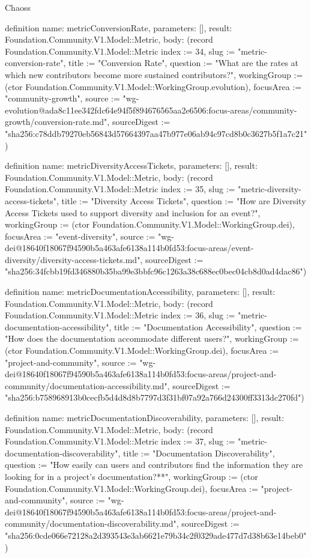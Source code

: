 \begin{lexlean}{Chaoss}
\begin{semanticmodule}
definition{
  name: metricConversionRate,
  parameters: [],
  result: Foundation.Community.V1.Model::Metric,
  body: (record Foundation.Community.V1.Model::Metric {index := 34, slug := "metric-conversion-rate", title := "Conversion Rate", question := "What are the rates at which new contributors become more sustained contributors?", workingGroup := (ctor Foundation.Community.V1.Model::WorkingGroup.evolution), focusArea := "community-growth", source := "wg-evolution@ada8c11ee342fdc64e94f5f894676565aa2e6506:focus-areas/community-growth/conversion-rate.md", sourceDigest := "sha256:c78ddb79270eb56843d57664397aa47b977e06ab94c97cd8b0c3627b5f1a7c21"})
}

definition{
  name: metricDiversityAccessTickets,
  parameters: [],
  result: Foundation.Community.V1.Model::Metric,
  body: (record Foundation.Community.V1.Model::Metric {index := 35, slug := "metric-diversity-access-tickets", title := "Diversity Access Tickets", question := "How are Diversity Access Tickets used to support diversity and inclusion for an event?", workingGroup := (ctor Foundation.Community.V1.Model::WorkingGroup.dei), focusArea := "event-diversity", source := "wg-dei@18640f18067f94590b5a463afe6138a114b0fd53:focus-areas/event-diversity/diversity-access-tickets.md", sourceDigest := "sha256:34fcbb19fd346880b35ba99e3bbfc96c1263a38c688ec0bec04cb8d0ad4dac86"})
}

definition{
  name: metricDocumentationAccessibility,
  parameters: [],
  result: Foundation.Community.V1.Model::Metric,
  body: (record Foundation.Community.V1.Model::Metric {index := 36, slug := "metric-documentation-accessibility", title := "Documentation Accessibility", question := "How does the documentation accommodate different users?", workingGroup := (ctor Foundation.Community.V1.Model::WorkingGroup.dei), focusArea := "project-and-community", source := "wg-dei@18640f18067f94590b5a463afe6138a114b0fd53:focus-areas/project-and-community/documentation-accessibility.md", sourceDigest := "sha256:b758968913b0cecfb5d4d8d8b7797d3f31bf07a92a766d24300ff3313dc270fd"})
}

definition{
  name: metricDocumentationDiscoverability,
  parameters: [],
  result: Foundation.Community.V1.Model::Metric,
  body: (record Foundation.Community.V1.Model::Metric {index := 37, slug := "metric-documentation-discoverability", title := "Documentation Discoverability", question := "How easily can users and contributors find the information they are looking for in a project’s documentation?**", workingGroup := (ctor Foundation.Community.V1.Model::WorkingGroup.dei), focusArea := "project-and-community", source := "wg-dei@18640f18067f94590b5a463afe6138a114b0fd53:focus-areas/project-and-community/documentation-discoverability.md", sourceDigest := "sha256:0cde066e72128a2d393543e3ab6621e79b34c2f0329ade477d7d38b63e14beb0"})
}


\end{semanticmodule}
\end{lexlean}
